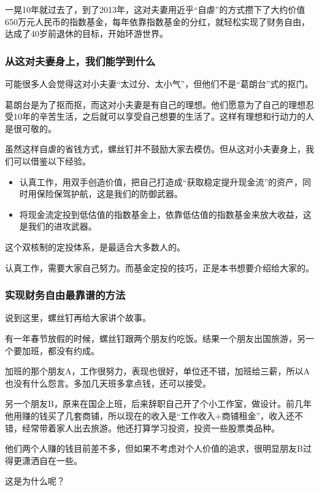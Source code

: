 一晃10年就过去了，到了2013年，这对夫妻用近乎“自虐”的方式攒下了大约价值650万元人民币的指数基金，每年依靠指数基金的分红，就轻松实现了财务自由，达成了40岁前退休的目标，开始环游世界。

\subsubsection{从这对夫妻身上，我们能学到什么}

可能很多人会觉得这对小夫妻“太过分、太小气”，但他们不是“葛朗台”式的抠门。

葛朗台是为了抠而抠，而这对小夫妻是有自己的理想。他们愿意为了自己的理想忍受10年的辛苦生活，之后就可以享受自己想要的生活了。这样有理想和行动力的人是很可敬的。

虽然这样自虐的省钱方式，螺丝钉并不鼓励大家去模仿。但从这对小夫妻身上，我们可以借鉴以下经验。

\begin{itemize}
\item 认真工作，用双手创造价值，把自己打造成“获取稳定提升现金流”的资产，同时用保险保驾护航，这是我们的防御武器。
\item 将现金流定投到低估值的指数基金上，依靠低估值的指数基金来放大收益，这是我们的进攻武器。
\end{itemize}

这个双核制的定投体系，是最适合大多数人的。

认真工作，需要大家自己努力。而基金定投的技巧，正是本书想要介绍给大家的。

\subsubsection{实现财务自由最靠谱的方法}

说到这里，螺丝钉再给大家讲个故事。

{\kaishu 有一年春节放假的时候，螺丝钉跟两个朋友约吃饭。结果一个朋友出国旅游，另一个要加班，都没有约成。}

{\kaishu 加班的那个朋友A，工作很努力，表现也很好，单位还不错，加班给三薪，所以A也没有什么怨言。多加几天班多拿点钱，还可以接受。}

{\kaishu 另一个朋友B，原来在国企上班，后来辞职自己开了个小工作室，做设计。前几年他用赚的钱买了几套商铺，所以现在的收入是“工作收入+商铺租金”，收入还不错，经常带着家人出去旅游。他还打算学习投资，投资一些股票类品种。}

他们两个人赚的钱目前差不多，但如果不考虑对个人价值的追求，很明显朋友B过得更潇洒自在一些。

这是为什么呢？

